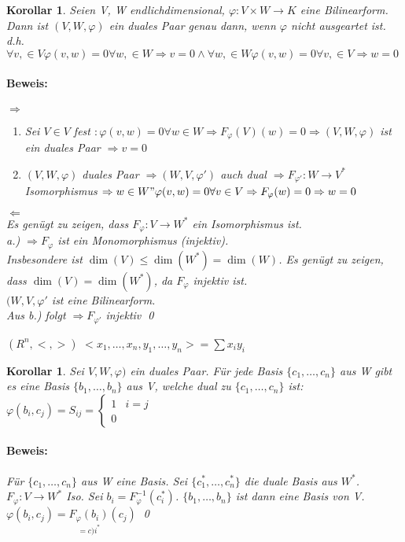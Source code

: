 \documentclass{report}
\theoremstyle{customrem}
\theoremstyle{customdef}
\newtheorem{korrolar}[definition]{Korollar}
\renewenvironment{proof}{\paragraph{Beweis: }}{\qed}
\theoremstyle{customenv}
\begin{document}
\begin{korrolar}
  Seien V, W endlichdimensional, \(\varphi : V \times W \to K\) eine
  Bilinearform. Dann ist \((V, W, \varphi)\) ein duales Paar genau dann, wenn
  \(\varphi\) nicht ausgeartet ist.\\
  d.h.
  \(\forall v, \in V \varphi(v, w) = 0 \forall w, \in W \Rightarrow v = 0 \land
  \forall w, \in W \varphi(v, w) = 0 \forall v, \in V \Rightarrow w = 0\)
  \begin{proof}
    \(\Rightarrow\)\\
    \begin{enumerate}
      \item{
          Sei \(V \in V\) fest \(: \varphi(v, w) = 0 \forall w \in W
        \Rightarrow F_\varphi(V)(w) = 0 \Rightarrow (V, W, \varphi)\) ist ein
        duales Paar \(\Rightarrow v = 0\)
      }
    \item{
      \((V, W, \varphi)\) duales Paar \(\Rightarrow (W, V, \varphi ')\) auch
        dual \(\Rightarrow F_{\varphi'} : W \to V^*\) Isomorphismus
        \(\Rightarrow w \in W " \varphi(v, w) = 0 \forall v \in V \Rightarrow
        F_{\varphi}(w) = 0 \Rightarrow w = 0\)
      }
    \end{enumerate}
    \(\Leftarrow\)\\
    Es gen\"ugt zu zeigen, dass \(F_{\varphi} : V \to W^*\) ein Isomorphismus
    ist.\\
    a.) \(\Rightarrow F_{\varphi}\)  ist ein Monomorphismus (injektiv).\\
    Insbesondere ist \(\dim(V) \le \dim(W^*) = \dim(W)\). Es gen\"ugt zu zeigen,
    dass \(\dim(V) = \dim(W^*)\), da \(F_{\varphi}\) injektiv ist.\\
    \((W, V, \varphi'\)  ist eine Bilinearform.\\
    Aus b.)  folgt \(\Rightarrow F_{\varphi'}\) injektiv
  \end{proof}
\end{korrolar}

\begin{beispiel}
  \((R^n, <, >)\)
  \(<x_1, \dots, x_n, y_1, \dots, y_n> = \sum x_i y_i\)
\end{beispiel}

\begin{korrolar}
  Sei \(V, W, \varphi)\) ein duales Paar. F\"ur jede Basis
  \(\{c_1, \dots, c_n\}\) aus W gibt es eine Basis \(\{b_1, \dots, b_n\}\) aus
  V, welche dual  zu \(\{c_1, \dots, c_n\}\) ist:
  \(\varphi(b_i, c_j) = S_{ij} = \begin{cases} 1 & i=j\\0 \end{cases}\)
  \begin{proof}
    F\"ur \(\{c_1, \dots, c_n\}\) aus W eine Basis. Sei
    \(\{c_1^*, \dots, c_n^*\}\) die duale Basis aus \(W^*\).\\
    \(F_{\varphi}: V \to W^*\) Iso. Sei \(b_i = F^{-1}_{\varphi}(c_i^*)\).
    \(\{b_1, \dots, b_n\}\) ist dann eine Basis von V.\\
    \(\varphi(b_i, c_j) = \underset{=c)i^*}{F_{\varphi}(b_i)}(c_j)\)
  \end{proof}
\end{korrolar}
\end{document}
